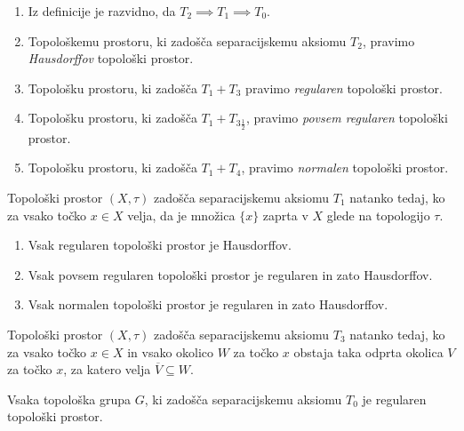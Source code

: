 \documentclass[mat1]{fmfdelo}
\newcommand{\closure}[1]{\overline{#1}}
\begin{document}
\begin{opomba}
	\begin{enumerate}
		\item Iz definicije je razvidno, da $T_2 \implies T_1 \implies T_0$.
		\item Topološkemu prostoru, ki zadošča separacijskemu aksiomu $T_2$, pravimo \emph{Hausdorffov} topološki prostor.
		\item Topološku prostoru, ki zadošča $T_1+T_3$ pravimo \emph{regularen} topološki prostor.
		\item Topološku prostoru, ki zadošča $T_1+T_{3 \frac{1}{2}}$, pravimo \emph{povsem regularen} topološki prostor.
		\item Topološku prostoru, ki zadošča $T_1+T_4$, pravimo \emph{normalen} topološki prostor.
	\end{enumerate}
\end{opomba}

\begin{trditev}\label{def:kart1}
	Topološki prostor $(X, \tau)$ zadošča separacijskemu aksiomu $T_1$ natanko tedaj, ko za vsako točko $x \in X$ velja, da je množica $\lbrace x \rbrace$ zaprta v $X$ glede na topologijo $\tau$.
\end{trditev}

\begin{posledica}\label{pos:reghaus}
	\begin{enumerate}
		\item Vsak regularen topološki prostor je Hausdorffov.
		\item Vsak povsem regularen topološki prostor je regularen in zato Hausdorffov.
		\item Vsak normalen topološki prostor je regularen in zato Hausdorffov.
	\end{enumerate}
\end{posledica}

\begin{trditev}\label{def:kart3}
	Topološki prostor $(X, \tau)$ zadošča separacijskemu aksiomu $T_3$ natanko tedaj, ko za vsako točko $x \in X$ in vsako okolico $W$ za točko $x$ obstaja taka odprta okolica $V$ za točko $x$, za katero velja $\closure{V} \subseteq W$.
\end{trditev}

\begin{izrek}\label{izr:t3}
	Vsaka topološka grupa $G$, ki zadošča separacijskemu aksiomu $T_0$ je regularen topološki prostor.
\end{izrek}
\end{document}
